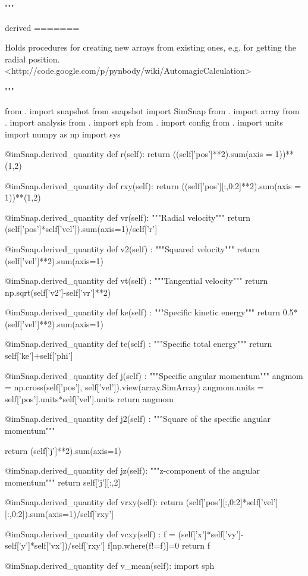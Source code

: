 
"""

derived
=======

Holds procedures for creating new arrays from existing ones, e.g. for
getting the radial position.
<http://code.google.com/p/pynbody/wiki/AutomagicCalculation>

"""

from . import snapshot
from snapshot import SimSnap
from . import array
from . import analysis
from . import sph
from . import config
from . import units
import numpy as np
import sys

@imSnap.derived_quantity
def r(self):
    return ((self['pos']**2).sum(axis = 1))**(1,2)

@imSnap.derived_quantity
def rxy(self):
    return ((self['pos'][:,0:2]**2).sum(axis = 1))**(1,2)

@imSnap.derived_quantity
def vr(self):
    """Radial velocity"""
    return (self['pos']*self['vel']).sum(axis=1)/self['r']


@imSnap.derived_quantity
def v2(self) :
    """Squared velocity"""
    return (self['vel']**2).sum(axis=1)

@imSnap.derived_quantity
def vt(self) :
    """Tangential velocity"""
    return np.sqrt(self['v2']-self['vr']**2)


@imSnap.derived_quantity
def ke(self) :
    """Specific kinetic energy"""
    return 0.5*(self['vel']**2).sum(axis=1)

@imSnap.derived_quantity
def te(self) :
    """Specific total energy"""
    return self['ke']+self['phi']

@imSnap.derived_quantity
def j(self) :
    """Specific angular momentum"""
    angmom = np.cross(self['pos'], self['vel']).view(array.SimArray)
    angmom.units = self['pos'].units*self['vel'].units
    return angmom

@imSnap.derived_quantity
def j2(self) :
    """Square of the specific angular momentum"""

    return (self['j']**2).sum(axis=1)

@imSnap.derived_quantity
def jz(self):
    """z-component of the angular momentum"""
    return self['j'][:,2]

@imSnap.derived_quantity
def vrxy(self):
    return (self['pos'][:,0:2]*self['vel'][:,0:2]).sum(axis=1)/self['rxy']

@imSnap.derived_quantity
def vcxy(self) :
    f = (self['x']*self['vy']-self['y']*self['vx'])/self['rxy']
    f[np.where(f!=f)]=0
    return f

@imSnap.derived_quantity
def v_mean(self):
    import sph

